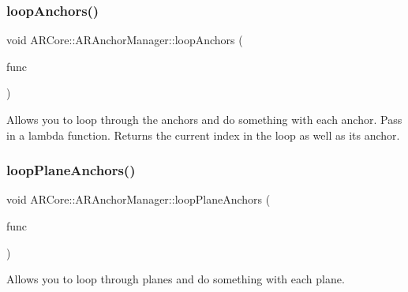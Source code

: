 \subsubsection{\texorpdfstring{loop\+Anchors()}{loopAnchors()}\hspace{0.1cm}{\footnotesize\ttfamily [2/2]}}
{\footnotesize\ttfamily void A\+R\+Core\+::\+A\+R\+Anchor\+Manager\+::loop\+Anchors (\begin{DoxyParamCaption}\item[{std\+::function$<$ void(\hyperlink{struct_a_r_objects_1_1_a_r_object}{A\+R\+Object}, int index)$>$}]{func }\end{DoxyParamCaption})}

Allows you to loop through the anchors and do something with each anchor. Pass in a lambda function. Returns the current index in the loop as well as it\textquotesingle{}s anchor. \mbox{\label{class_a_r_core_1_1_a_r_anchor_manager_a170e30f7226b84eaede22392f08d5521}} 
\subsubsection{\texorpdfstring{loop\+Plane\+Anchors()}{loopPlaneAnchors()}\hspace{0.1cm}{\footnotesize\ttfamily [1/2]}}
{\footnotesize\ttfamily void A\+R\+Core\+::\+A\+R\+Anchor\+Manager\+::loop\+Plane\+Anchors (\begin{DoxyParamCaption}\item[{std\+::function$<$ void(\hyperlink{struct_a_r_objects_1_1_plane_anchor_object}{Plane\+Anchor\+Object})$>$}]{func }\end{DoxyParamCaption})}



Allows you to loop through planes and do something with each plane. 

\mbox{\label{class_a_r_core_1_1_a_r_anchor_manager_a6f3215e085a92b1165b3da58138adbfc}} 
